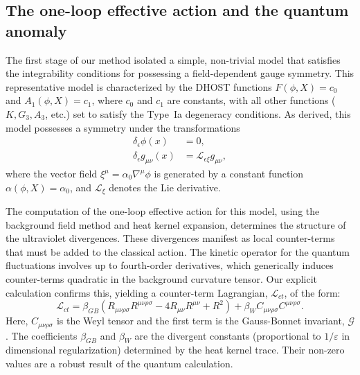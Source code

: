 \documentclass[twocolumn]{aastex631}
\begin{document}
\subsection{The one-loop effective action and the quantum anomaly}
The first stage of our method isolated a simple, non-trivial model that satisfies the integrability conditions for possessing a field-dependent gauge symmetry. This representative model is characterized by the DHOST functions $F(\phi, X) = c_0$ and $A_1(\phi, X) = c_1$, where $c_0$ and $c_1$ are constants, with all other functions ($K, G_3, A_3$, etc.) set to satisfy the Type~Ia degeneracy conditions. As derived, this model possesses a symmetry under the transformations
\begin{align}
    \delta_\epsilon \phi(x) &= 0, \label{eq:symm_phi} \\
    \delta_\epsilon g_{\mu\nu}(x) &= \mathcal{L}_{\epsilon \xi} g_{\mu\nu}, \label{eq:symm_g}
\end{align}
where the vector field $\xi^\mu = \alpha_0 \nabla^\mu\phi$ is generated by a constant function $\alpha(\phi, X) = \alpha_0$, and $\mathcal{L}_{\xi}$ denotes the Lie derivative.

The computation of the one-loop effective action for this model, using the background field method and heat kernel expansion, determines the structure of the ultraviolet divergences. These divergences manifest as local counter-terms that must be added to the classical action. The kinetic operator for the quantum fluctuations involves up to fourth-order derivatives, which generically induces counter-terms quadratic in the background curvature tensor. Our explicit calculation confirms this, yielding a counter-term Lagrangian, $\mathcal{L}_{ct}$, of the form:
\begin{equation}
\label{eq:L_ct}
\mathcal{L}_{ct} = \beta_{GB} \left( R_{\mu\nu\rho\sigma}R^{\mu\nu\rho\sigma} - 4 R_{\mu\nu}R^{\mu\nu} + R^2 \right) + \beta_{W} C_{\mu\nu\rho\sigma}C^{\mu\nu\rho\sigma}.
\end{equation}
Here, $C_{\mu\nu\rho\sigma}$ is the Weyl tensor and the first term is the Gauss-Bonnet invariant, $\mathcal{G}$. The coefficients $\beta_{GB}$ and $\beta_{W}$ are the divergent constants (proportional to $1/\varepsilon$ in dimensional regularization) determined by the heat kernel trace. Their non-zero values are a robust result of the quantum calculation.
\end{document}
